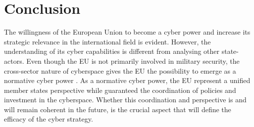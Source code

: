 \section{Conclusion}
The willingness of the European Union to become a cyber power and increase its strategic relevance in the international field is evident. However, the understanding of its cyber capabilities is different from analysing other state-actors. Even though the EU is not primarily involved in military security, the cross-sector nature of cyberspace gives the EU the possibility to emerge as a normative cyber power \autocite{wagnsson_2018_normative}. As a normative cyber power, the EU represent a unified member states perspective while guaranteed the coordination of policies and investment in the cyberspace. Whether this coordination and perspective is and will remain coherent in the future, is the crucial aspect that will define the efficacy of the cyber strategy. 



